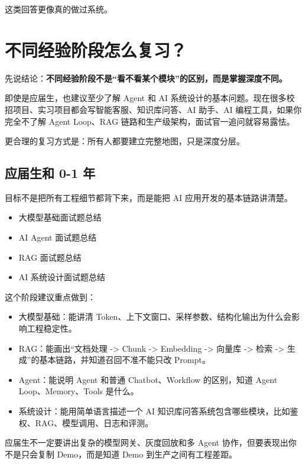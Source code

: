 \documentclass[9pt,a4paper,twocolumn]{ctexart}
\begin{document}
这类回答更像真的做过系统。



\section*{不同经验阶段怎么复习？}


先说结论：\textbf{不同经验阶段不是“看不看某个模块”的区别，而是掌握深度不同。}



即使是应届生，也建议至少了解 Agent 和 AI 系统设计的基本问题。现在很多校招项目、实习项目都会写智能客服、知识库问答、AI 助手、AI 编程工具，如果你完全不了解 Agent Loop、RAG 链路和生产级架构，面试官一追问就容易露怯。



更合理的复习方式是：所有人都要建立完整地图，只是深度分层。



\subsection*{应届生和 0-1 年}


目标不是把所有工程细节都背下来，而是能把 AI 应用开发的基本链路讲清楚。


\begin{itemize}[itemsep=1pt, topsep=2pt]
  \item 大模型基础面试题总结
  \item AI Agent 面试题总结
  \item RAG 面试题总结
  \item AI 系统设计面试题总结
\end{itemize}


这个阶段建议重点做到：


\begin{itemize}[itemsep=1pt, topsep=2pt]
  \item 大模型基础：能讲清 Token、上下文窗口、采样参数、结构化输出为什么会影响工程稳定性。
  \item RAG：能画出“文档处理 -> Chunk -> Embedding -> 向量库 -> 检索 -> 生成”的基本链路，并知道召回不准不能只改 Prompt。
  \item Agent：能说明 Agent 和普通 Chatbot、Workflow 的区别，知道 Agent Loop、Memory、Tools 是什么。
  \item 系统设计：能用简单语言描述一个 AI 知识库问答系统包含哪些模块，比如鉴权、RAG、模型调用、日志和评测。
\end{itemize}


应届生不一定要讲出复杂的模型网关、灰度回放和多 Agent 协作，但要表现出你不是只会复制 Demo，而是知道 Demo 到生产之间有工程差距。
\end{document}
